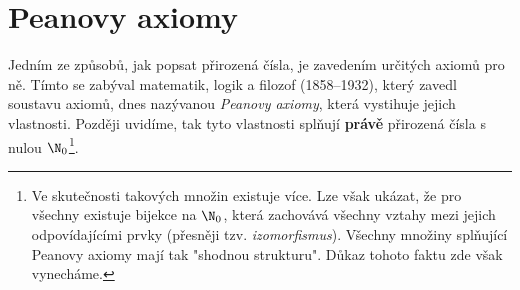 \section{Peanovy axiomy}\label{sec:peanovy_axiomy}
Jedním ze způsobů, jak popsat přirozená čísla, je zavedením určitých axiomů pro ně. Tímto se zabýval matematik, logik a filozof  (1858--1932), který zavedl soustavu axiomů, dnes nazývanou \emph{Peanovy axiomy}, která vystihuje jejich vlastnosti. Později uvidíme, tak tyto vlastnosti splňují \textbf{právě} přirozená čísla s nulou $\N_0$\footnote{Ve skutečnosti takových množin existuje více. Lze však ukázat, že pro všechny existuje bijekce na $\N_0$, která zachovává všechny vztahy mezi jejich odpovídajícími prvky (přesněji tzv. \emph{izomorfismus}). Všechny množiny splňující Peanovy axiomy mají tak "shodnou strukturu". Důkaz tohoto faktu zde však vynecháme.}.
\medskip

